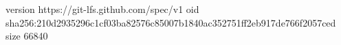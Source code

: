 version https://git-lfs.github.com/spec/v1
oid sha256:210d2935296c1cf03ba82576c85007b1840ac352751ff2eb917de766f2057ced
size 66840
